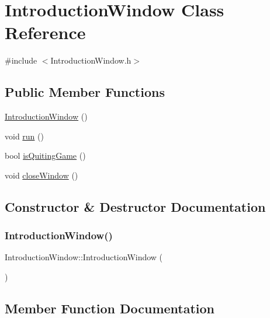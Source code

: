\hypertarget{class_introduction_window}{}\section{Introduction\+Window Class Reference}
\label{class_introduction_window}


{\ttfamily \#include $<$Introduction\+Window.\+h$>$}

\subsection*{Public Member Functions}
\begin{DoxyCompactItemize}
\item 
\hyperlink{class_introduction_window_a7c8c0166794f3d307c5de4d57f9ef5e0}{Introduction\+Window} ()
\item 
void \hyperlink{class_introduction_window_a18d9a74bc2c18827a8e45758b148f8d7}{run} ()
\item 
bool \hyperlink{class_introduction_window_a1d4874be8dcba17d58ba82a848829390}{is\+Quiting\+Game} ()
\item 
void \hyperlink{class_introduction_window_ac3a87ad4e554621ecd2e374933fbe89d}{close\+Window} ()
\end{DoxyCompactItemize}


\subsection{Constructor \& Destructor Documentation}
\mbox{\label{class_introduction_window_a7c8c0166794f3d307c5de4d57f9ef5e0}} 
\subsubsection{\texorpdfstring{Introduction\+Window()}{IntroductionWindow()}}
{\footnotesize\ttfamily Introduction\+Window\+::\+Introduction\+Window (\begin{DoxyParamCaption}{ }\end{DoxyParamCaption})}



\subsection{Member Function Documentation}
\mbox{\label{class_introduction_window_ac3a87ad4e554621ecd2e374933fbe89d}} 
